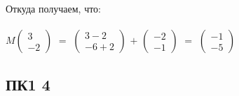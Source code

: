 \begin{enumerate}
			Откуда получаем, что: \\ \\
			$M \left( \begin{array}{c}
			3 \\
			-2
			\end{array} \right)$ $=$
			$\left( \begin{array}{cc}
			3 - 2 \\
			-6 + 2
			\end{array} \right)$ $+$
			$\left( \begin{array}{c}
			-2 \\
			-1
			\end{array} \right)$ $=$
			$\left( \begin{array}{c}
			-1 \\
			-5
			\end{array} \right)$
			
		\end{enumerate}
	
		\subsection{ПК1 4}
		
